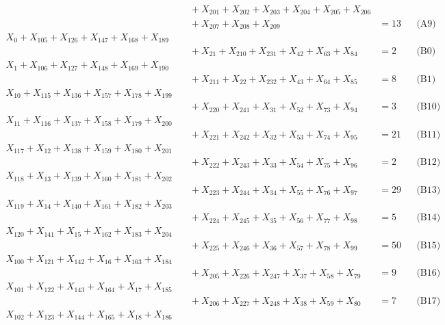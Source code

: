 \documentclass[a4paper,10pt]{article}
\begin{document}
{\begin{align}
&\quad  + X_{201} + X_{202} + X_{203} + X_{204} + X_{205} + X_{206} \\[0.5ex]
&\quad  + X_{207} + X_{208} + X_{209} &= 13 && \text{(A9)} \\
X_{0} + X_{105} + X_{126} + X_{147} + X_{168} + X_{189} \\[0.5ex]
&\quad  + X_{21} + X_{210} + X_{231} + X_{42} + X_{63} + X_{84} &= 2 && \text{(B0)} \\
X_{1} + X_{106} + X_{127} + X_{148} + X_{169} + X_{190} \\[0.5ex]
&\quad  + X_{211} + X_{22} + X_{232} + X_{43} + X_{64} + X_{85} &= 8 && \text{(B1)} \\
X_{10} + X_{115} + X_{136} + X_{157} + X_{178} + X_{199} \\[0.5ex]
&\quad  + X_{220} + X_{241} + X_{31} + X_{52} + X_{73} + X_{94} &= 3 && \text{(B10)} \\
X_{11} + X_{116} + X_{137} + X_{158} + X_{179} + X_{200} \\[0.5ex]
&\quad  + X_{221} + X_{242} + X_{32} + X_{53} + X_{74} + X_{95} &= 21 && \text{(B11)} \\
X_{117} + X_{12} + X_{138} + X_{159} + X_{180} + X_{201} \\[0.5ex]
&\quad  + X_{222} + X_{243} + X_{33} + X_{54} + X_{75} + X_{96} &= 2 && \text{(B12)} \\
X_{118} + X_{13} + X_{139} + X_{160} + X_{181} + X_{202} \\[0.5ex]
&\quad  + X_{223} + X_{244} + X_{34} + X_{55} + X_{76} + X_{97} &= 29 && \text{(B13)} \\
X_{119} + X_{14} + X_{140} + X_{161} + X_{182} + X_{203} \\[0.5ex]
&\quad  + X_{224} + X_{245} + X_{35} + X_{56} + X_{77} + X_{98} &= 5 && \text{(B14)} \\
X_{120} + X_{141} + X_{15} + X_{162} + X_{183} + X_{204} \\[0.5ex]
&\quad  + X_{225} + X_{246} + X_{36} + X_{57} + X_{78} + X_{99} &= 50 && \text{(B15)} \\
\allowbreak
X_{100} + X_{121} + X_{142} + X_{16} + X_{163} + X_{184} \\[0.5ex]
&\quad  + X_{205} + X_{226} + X_{247} + X_{37} + X_{58} + X_{79} &= 9 && \text{(B16)} \\
X_{101} + X_{122} + X_{143} + X_{164} + X_{17} + X_{185} \\[0.5ex]
&\quad  + X_{206} + X_{227} + X_{248} + X_{38} + X_{59} + X_{80} &= 7 && \text{(B17)} \\
X_{102} + X_{123} + X_{144} + X_{165} + X_{18} + X_{186} \\[0.5ex]

\end{align}}
\end{document}
